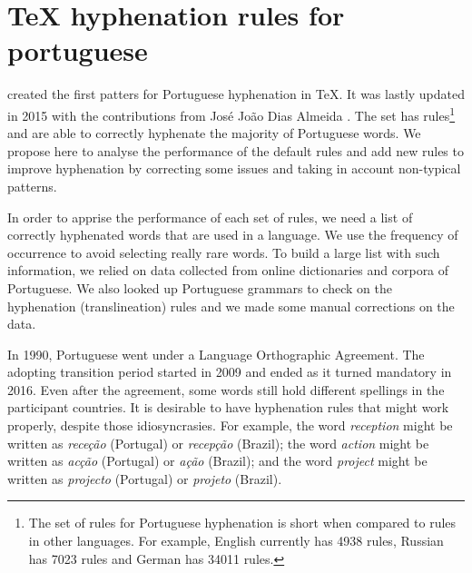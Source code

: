 \documentclass{article}
\begin{document}
\section{\TeX{} hyphenation rules for portuguese}\label{sec-tex-hyphen-pt}

\cite{rezende1987} created the first patters for Portuguese hyphenation in
\TeX{}. It was lastly updated in 2015 with the contributions from José João
Dias Almeida \cite{hyphpt}. The set has \NumberOfDefaultRules{}
rules\footnote{The set of rules for Portuguese hyphenation is short when
compared to rules in other languages. For example, English currently has 4938
rules, Russian has 7023 rules and German has 34011 rules.} and are able to
correctly hyphenate the majority of Portuguese words. We propose here to
analyse the performance of the default rules and add new rules to improve
hyphenation by correcting some issues and taking in account non-typical
patterns.

In order to apprise the performance of each set of rules, we need a list of
correctly hyphenated words that are used in a language. We use the frequency of
occurrence to avoid selecting really rare words. To build a large list with
such information, we relied on data collected from online dictionaries and
corpora of Portuguese. We also looked up Portuguese grammars to check on the
hyphenation (translineation) rules and we made some manual corrections on the
data.

In 1990, Portuguese went under a Language Orthographic Agreement. The adopting
transition period started in 2009 and ended as it turned mandatory in 2016.
Even after the agreement, some words still hold different spellings in the
participant countries. It is desirable to have hyphenation rules that might
work properly, despite those idiosyncrasies.  For example, the word
\emph{reception} might be written as \emph{receção} (Portugal) or
\emph{recepção} (Brazil); the word \emph{action} might be written as
\emph{acção} (Portugal) or \emph{ação} (Brazil); and the word \emph{project} might be
written as \emph{projecto} (Portugal) or \emph{projeto} (Brazil).


\end{document}

